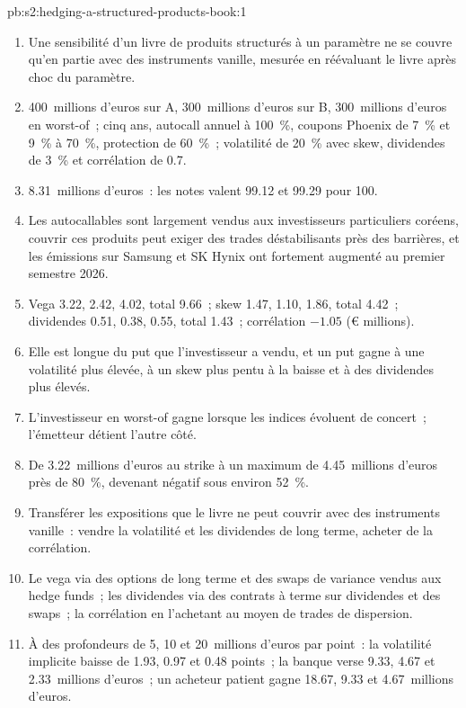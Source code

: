 \begin{solution}{pb:s2:hedging-a-structured-products-book:1}
\begin{enumerate}
\item Une sensibilité d'un livre de produits structurés à un paramètre ne se couvre qu'en partie avec des instruments vanille, mesurée en réévaluant le livre après choc du paramètre.
\item 400~millions d'euros sur A, 300~millions d'euros sur B, 300~millions d'euros en worst-of~; cinq ans, autocall annuel à 100~\%, coupons Phoenix de 7~\%
et 9~\% à 70~\%, protection de 60~\%~; volatilité de 20~\% avec skew, dividendes de 3~\% et corrélation de 0.7.
\item 8.31~millions d'euros~: les notes valent 99.12 et 99.29 pour 100.
\item Les autocallables sont largement vendus aux investisseurs particuliers coréens, couvrir ces produits peut exiger des trades déstabilisants près des barrières, et les émissions sur Samsung
et SK Hynix ont fortement augmenté au premier semestre 2026.
\item Vega 3.22, 2.42, 4.02, total 9.66~; skew 1.47, 1.10, 1.86, total 4.42~; dividendes 0.51, 0.38, 0.55, total 1.43~; corrélation $-1.05$ (\euro{}
millions).
\item Elle est longue du put que l'investisseur a vendu, et un put gagne à une volatilité plus élevée, à un skew plus pentu à la baisse et à des dividendes plus élevés.
\item L'investisseur en worst-of gagne lorsque les indices évoluent de concert~; l'émetteur détient l'autre côté.
\item De 3.22~millions d'euros au strike à un maximum de 4.45~millions d'euros près de 80~\%, devenant négatif sous environ 52~\%.
\item Transférer les expositions que le livre ne peut couvrir avec des instruments vanille~: vendre la volatilité et les dividendes de long terme, acheter de la corrélation.
\item Le vega via des options de long terme et des swaps de variance vendus aux hedge funds~; les dividendes via des contrats à terme sur dividendes et des swaps~; la corrélation en l'achetant
au moyen de trades de dispersion.
\item À des profondeurs de 5, 10 et 20~millions d'euros par point~: la volatilité implicite baisse de 1.93, 0.97 et 0.48 points~; la banque verse 9.33, 4.67 et 2.33~millions d'euros~;
un acheteur patient gagne 18.67, 9.33 et 4.67~millions d'euros.

\end{enumerate}
\end{solution}

